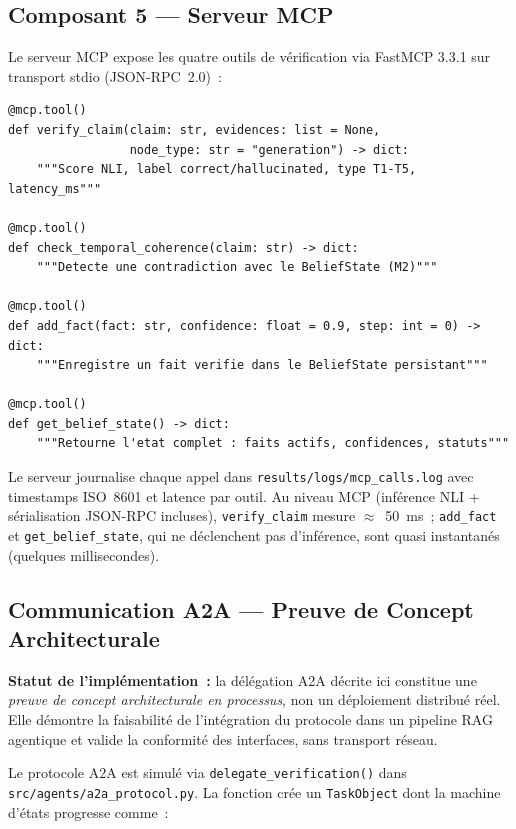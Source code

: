 \documentclass[12pt,a4paper]{article}
\begin{document}
\subsection{Composant 5 --- Serveur MCP}

Le serveur MCP expose les quatre outils de vérification via FastMCP 3.3.1 sur transport stdio (JSON-RPC~2.0)~:

\begin{lstlisting}[caption={Signatures des 4 outils MCP}, label={lst:mcp}]
@mcp.tool()
def verify_claim(claim: str, evidences: list = None,
                 node_type: str = "generation") -> dict:
    """Score NLI, label correct/hallucinated, type T1-T5, latency_ms"""

@mcp.tool()
def check_temporal_coherence(claim: str) -> dict:
    """Detecte une contradiction avec le BeliefState (M2)"""

@mcp.tool()
def add_fact(fact: str, confidence: float = 0.9, step: int = 0) -> dict:
    """Enregistre un fait verifie dans le BeliefState persistant"""

@mcp.tool()
def get_belief_state() -> dict:
    """Retourne l'etat complet : faits actifs, confidences, statuts"""
\end{lstlisting}

Le serveur journalise chaque appel dans \texttt{results/logs/mcp\_calls.log} avec timestamps ISO~8601 et latence par outil. Au niveau MCP (inférence NLI + sérialisation JSON-RPC incluses), \texttt{verify\_claim} mesure $\approx$~50~ms~; \texttt{add\_fact} et \texttt{get\_belief\_state}, qui ne déclenchent pas d'inférence, sont quasi instantanés (quelques millisecondes).

\subsection{Communication A2A --- Preuve de Concept Architecturale}
\label{sec:a2a}

\textbf{Statut de l'implémentation~:} la délégation A2A décrite ici constitue une \textit{preuve de concept architecturale en processus}, non un déploiement distribué réel. Elle démontre la faisabilité de l'intégration du protocole dans un pipeline RAG agentique et valide la conformité des interfaces, sans transport réseau.

Le protocole A2A \cite{google2024a2a} est simulé via \texttt{delegate\_verification()} dans \texttt{src/agents/a2a\_protocol.py}. La fonction crée un \texttt{TaskObject} dont la machine d'états progresse comme~:
\end{document}

